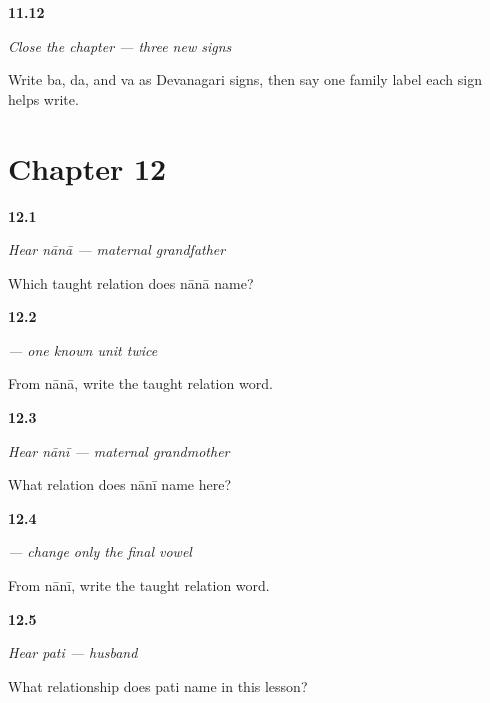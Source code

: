 \noindent\begin{minipage}[t]{\linewidth}
\raggedright
\hypertarget{review-MW-R08-script-close-three}{\textbf{11.12}} \emph{Close the chapter — three new signs}\par
\small Write ba, da, and va as Devanagari signs, then say one family label each sign helps write.
\end{minipage}\par\medskip

\section*{Chapter 12}

\noindent\begin{minipage}[t]{\linewidth}
\raggedright
\hypertarget{review-MW-C09-hear-nana-meaning}{\textbf{12.1}} \emph{Hear \emph{nānā} — maternal grandfather}\par
\small Which taught relation does nānā name?
\end{minipage}\par\medskip

\noindent\begin{minipage}[t]{\linewidth}
\raggedright
\hypertarget{review-MW-C09-nana-dictation}{\textbf{12.2}} \emph{ — one known unit twice}\par
\small From nānā, write the taught relation word.
\end{minipage}\par\medskip

\noindent\begin{minipage}[t]{\linewidth}
\raggedright
\hypertarget{review-MW-C09-hear-nani-meaning}{\textbf{12.3}} \emph{Hear \emph{nānī} — maternal grandmother}\par
\small What relation does nānī name here?
\end{minipage}\par\medskip

\noindent\begin{minipage}[t]{\linewidth}
\raggedright
\hypertarget{review-MW-C09-nani-dictation}{\textbf{12.4}} \emph{ — change only the final vowel}\par
\small From nānī, write the taught relation word.
\end{minipage}\par\medskip

\noindent\begin{minipage}[t]{\linewidth}
\raggedright
\hypertarget{review-MW-C09-hear-pati-meaning}{\textbf{12.5}} \emph{Hear \emph{pati} — husband}\par
\small What relationship does pati name in this lesson?
\end{minipage}\par\medskip

